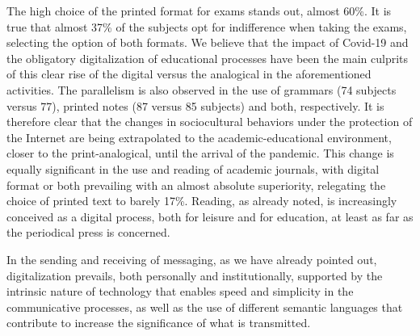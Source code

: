 \documentclass[english]{textolivre}
\begin{document}
The high choice of the printed format for exams stands out, almost 60\%. It is true that almost 37\% of the subjects opt for indifference when taking the exams, selecting the option of both formats. We believe that the impact of Covid-19 and the obligatory digitalization of educational processes \cite{cabero2020covid, suarez-guerrero_digitalizacion_2022, ramos_ensenanza_2022} have been the main culprits of this clear rise of the digital versus the analogical in the aforementioned activities. The parallelism is also observed in the use of grammars (74 subjects versus 77), printed notes (87 versus 85 subjects) and both, respectively. It is therefore clear that the changes in sociocultural behaviors under the protection of the Internet \cite{buendia2016redes} are being extrapolated to the academic-educational environment, closer to the print-analogical, until the arrival of the pandemic. This change is equally significant in the use and reading of academic journals, with digital format or both prevailing with an almost absolute superiority, relegating the choice of printed text to barely 17\%. Reading, as already noted, is increasingly conceived as a digital process, both for leisure and for education, at least as far as the periodical press is concerned.

In the sending and receiving of messaging, as we have already pointed out, digitalization prevails, both personally and institutionally, supported by the intrinsic nature of technology that enables speed and simplicity in the communicative processes, as well as the use of different semantic languages that contribute to increase the significance of what is transmitted. 
\end{document}
